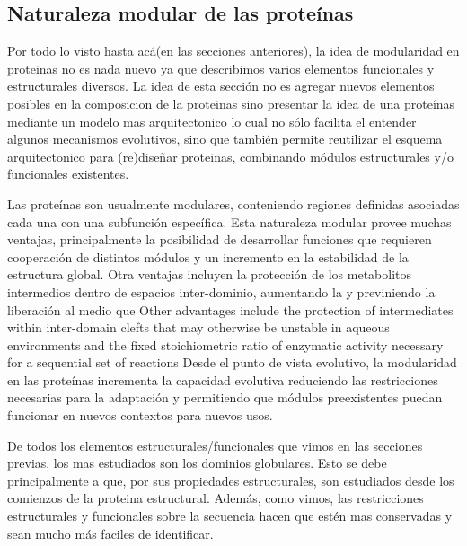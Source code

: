 \subsection{Naturaleza modular de las proteínas}

Por todo lo visto hasta acá(en las secciones anteriores), la idea de modularidad en proteinas no es nada nuevo ya que 
describimos varios elementos funcionales y estructurales diversos.
La idea de esta sección no es agregar nuevos elementos posibles en la composicion de la proteinas sino presentar la idea de una proteínas mediante un modelo mas arquitectonico lo cual no sólo facilita el entender 
algunos mecanismos evolutivos,
 sino que también permite 
reutilizar el esquema arquitectonico para (re)diseñar proteinas, combinando módulos estructurales y/o funcionales existentes.


Las proteínas son usualmente modulares, conteniendo regiones definidas asociadas cada una con una subfunción específica.
Esta naturaleza modular provee muchas ventajas, principalmente la posibilidad de desarrollar funciones que requieren cooperación de distintos módulos y un incremento en la estabilidad de la estructura global.
Otra ventajas incluyen la protección de los metabolitos intermedios dentro de espacios inter-dominio, aumentando la   y previniendo la liberación al medio que 
Other advantages include the protection of intermediates within inter-domain clefts that may otherwise be unstable in aqueous environments 
and the fixed stoichiometric ratio of enzymatic activity necessary for a sequential set of reactions
Desde el punto de vista evolutivo, la modularidad en las proteínas incrementa la capacidad evolutiva reduciendo las restricciones necesarias para la adaptación y permitiendo que módulos preexistentes puedan funcionar en nuevos contextos para nuevos usos.


% 
De todos los elementos estructurales/funcionales que vimos en las secciones previas, los mas estudiados son los dominios globulares. 
Esto se debe principalmente a que, por sus propiedades estructurales, son estudiados desde los comienzos de la proteina estructural.
Además, como vimos, las restricciones estructurales y funcionales sobre la secuencia hacen que estén mas conservadas y sean mucho más faciles de identificar.

